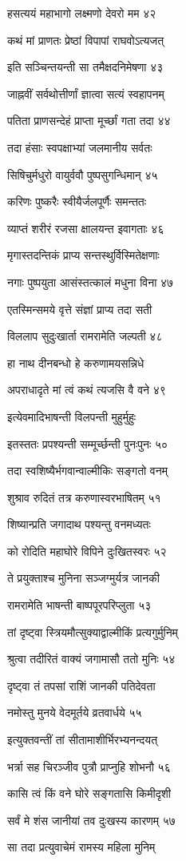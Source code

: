 हसत्ययं महाभागो लक्ष्मणो देवरो मम ४२

कथं मां प्राणतः प्रेष्ठां विपापां राघवोऽत्यजत्

इति सञ्चिन्तयन्ती सा तमैक्षदनिमेषणा ४३

जाह्नवीं सर्वथोत्तीर्णां ज्ञात्वा सत्यं स्वहापनम्

पतिता प्राणसन्देहं प्राप्ता मूर्च्छां गता तदा ४४

तदा हंसाः स्वपक्षाभ्यां जलमानीय सर्वतः

सिषिचुर्मधुरो वायुर्ववौ पुष्पसुगन्धिमान् ४५

करिणः पुष्करैः स्वीयैर्जलपूर्णैः समन्ततः

व्याप्तं शरीरं रजसा क्षालयन्त इवागताः ४६

मृगास्तदन्तिकं प्राप्य सन्तस्थुर्विस्मितेक्षणाः

नगाः पुष्पयुता आसंस्तत्कालं मधुना विना ४७

एतस्मिन्समये वृत्ते संज्ञां प्राप्य तदा सती

विललाप सुदुःखार्ता रामरामेति जल्पती ४८

हा नाथ दीनबन्धो हे करुणामयसन्निधे

अपराधादृते मां त्वं कथं त्यजसि वै वने ४९

इत्येवमादिभाषन्ती विलपन्ती मुहुर्मुहुः

इतस्ततः प्रपश्यन्ती सम्मूर्च्छन्ती पुनःपुनः ५०

तदा स्वशिष्यैर्भगवान्वाल्मीकिः सङ्गतो वनम्

शुश्राव रुदितं तत्र करुणास्वरभाषितम् ५१

शिष्यान्प्रति जगादाथ पश्यन्तु वनमध्यतः

को रोदिति महाघोरे विपिने दुःखितस्वरः ५२

ते प्रयुक्ताश्च मुनिना सञ्जग्मुर्यत्र जानकी

रामरामेति भाषन्ती बाष्पपूरपरिप्लुता ५३

तां दृष्ट्वा स्त्रियमौत्सुक्याद्वाल्मीकिं प्रत्यगुर्मुनिम्

श्रुत्वा तदीरितं वाक्यं जगामासौ ततो मुनिः ५४

दृष्ट्वा तं तपसां राशिं जानकी पतिदेवता

नमोस्तु मुनये वेदमूर्तये व्रतवार्धये ५५

इत्युक्तवन्तीं तां सीतामाशीर्भिरभ्यनन्दयत्

भर्त्रा सह चिरञ्जीव पुत्रौ प्राप्नुहि शोभनौ ५६

कासि त्वं किं वने घोरे सङ्गतासि किमीदृशी

सर्वं मे शंस जानीयां तव दुःखस्य कारणम् ५७

सा तदा प्रत्युवाचेमं रामस्य महिला मुनिम्

